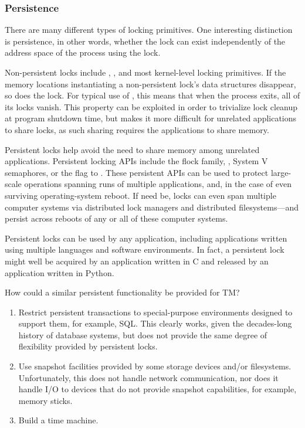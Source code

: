 \subsubsection{Persistence}
\label{sec:future:Persistence}

There are many different types of locking primitives.
One interesting distinction is persistence, in other words, whether the
lock can exist independently of the address space of the process using
the lock.

Non-persistent locks include ,
, and most kernel-level locking primitives.
If the memory locations instantiating a non-persistent lock's data
structures disappear, so does the lock.
For typical use of , this means that when the
process exits, all of its locks vanish.
This property can be exploited in order to trivialize lock cleanup
at program shutdown time, but makes it more difficult for unrelated
applications to share locks, as such sharing requires the applications
to share memory.

Persistent locks help avoid the need to share memory among unrelated
applications.
Persistent locking APIs include the flock family, , System
V semaphores, or the  flag to .
These persistent APIs can be used to protect large-scale operations
spanning runs of multiple applications, and, in the case of 
even surviving operating-system reboot.
If need be, locks can even span multiple computer systems via distributed
lock managers and distributed filesystems---and persist across reboots
of any or all of these computer systems.

Persistent locks can be used by any application, including applications
written using multiple languages and software environments.
In fact, a persistent lock might well be acquired by an application written
in C and released by an application written in Python.

How could a similar persistent functionality be provided for TM?

\begin{enumerate}
\item	Restrict persistent transactions to special-purpose environments
	designed to support them, for example, SQL.
	This clearly works, given the decades-long history of database
	systems, but does not provide the same degree of flexibility
	provided by persistent locks.
\item	Use snapshot facilities provided by some storage devices and/or
	filesystems.
	Unfortunately, this does not handle network communication,
	nor does it handle I/O to devices that do not provide snapshot
	capabilities, for example, memory sticks.
\item	Build a time machine.
\end{enumerate}

